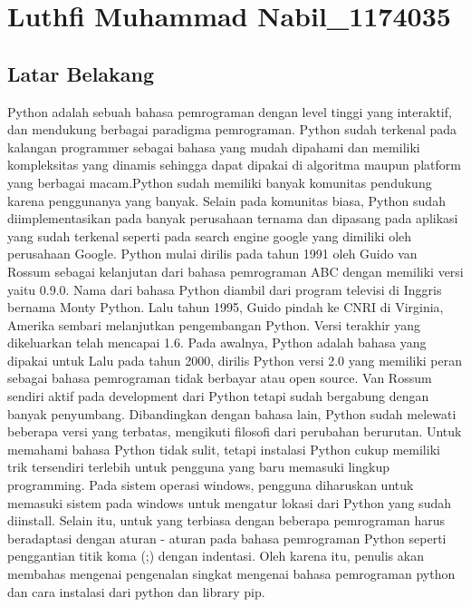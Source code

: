 \section{Luthfi Muhammad Nabil\_1174035}
\subsection{Latar Belakang}
Python adalah sebuah bahasa pemrograman dengan level tinggi yang interaktif, dan mendukung berbagai paradigma pemrograman. Python sudah terkenal pada kalangan programmer sebagai bahasa yang mudah dipahami dan memiliki kompleksitas yang dinamis sehingga dapat dipakai di algoritma maupun platform yang berbagai macam.Python sudah memiliki banyak komunitas pendukung karena penggunanya yang banyak. Selain pada komunitas biasa, Python sudah diimplementasikan pada banyak perusahaan ternama dan dipasang pada aplikasi yang sudah terkenal seperti pada search engine google yang dimiliki oleh perusahaan Google. 
\linebreak
\linebreak
Python mulai dirilis pada tahun 1991 oleh Guido van Rossum sebagai kelanjutan dari bahasa pemrograman ABC dengan memiliki versi yaitu 0.9.0. Nama dari bahasa Python diambil dari program televisi di Inggris bernama Monty Python. Lalu tahun 1995, Guido pindah ke CNRI di Virginia, Amerika sembari melanjutkan pengembangan Python. Versi terakhir yang dikeluarkan telah mencapai 1.6. Pada awalnya, Python adalah bahasa yang dipakai untuk  Lalu pada tahun 2000, dirilis Python versi 2.0 yang memiliki peran sebagai bahasa pemrograman tidak berbayar atau open source. Van Rossum sendiri aktif pada development dari Python tetapi sudah bergabung dengan banyak penyumbang. Dibandingkan dengan bahasa lain, Python sudah melewati beberapa versi yang terbatas, mengikuti filosofi dari perubahan berurutan. 
\linebreak
\linebreak
Untuk memahami bahasa Python tidak sulit, tetapi instalasi Python cukup memiliki trik tersendiri terlebih untuk pengguna yang baru memasuki lingkup programming. Pada sistem operasi windows, pengguna diharuskan untuk memasuki sistem pada windows untuk mengatur lokasi dari Python yang sudah diinstall. Selain itu, untuk yang terbiasa dengan beberapa pemrograman harus beradaptasi dengan aturan - aturan pada bahasa pemrograman Python seperti penggantian titik koma (;) dengan indentasi. Oleh karena itu, penulis akan membahas mengenai pengenalan singkat mengenai bahasa pemrograman python dan cara instalasi dari python dan library pip.

